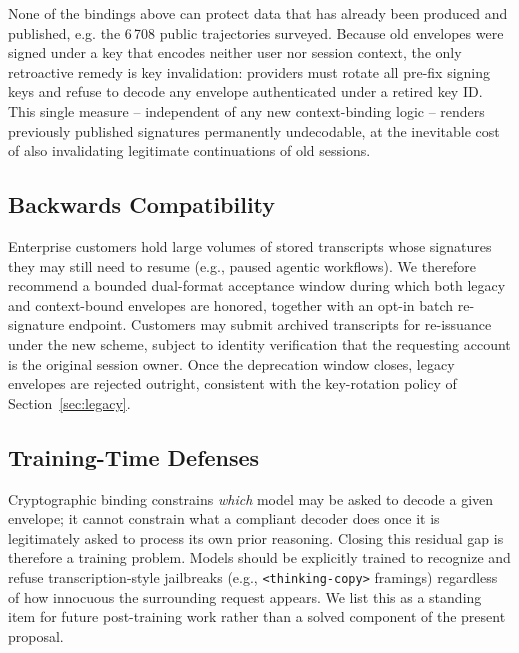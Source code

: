 None of the bindings above can protect data that has already been
produced and published, e.g. the 6\,708 public trajectories
surveyed.  Because old envelopes
were signed under a key that encodes neither user nor session context,
the only retroactive remedy is key invalidation: providers must rotate
all pre-fix signing keys and refuse to decode any envelope authenticated
under a retired key ID.  This single measure -- independent of any new
context-binding logic -- renders previously published signatures
permanently undecodable, at the inevitable cost of also invalidating
legitimate continuations of old sessions.

\subsection{Backwards Compatibility}
\label{sec:backcompat}

Enterprise customers hold large volumes of stored transcripts whose
signatures they may still need to resume (e.g., paused agentic workflows).
We therefore recommend a bounded dual-format acceptance window during
which both legacy and context-bound envelopes are honored, together with
an opt-in batch re-signature endpoint.  Customers may submit archived
transcripts for re-issuance under the new scheme, subject to identity
verification that the requesting account is the original session owner.
Once the deprecation window closes, legacy envelopes are rejected
outright, consistent with the key-rotation policy of
Section~\ref{sec:legacy}.

\subsection{Training-Time Defenses}
\label{sec:training}

Cryptographic binding constrains \emph{which} model may be asked to
decode a given envelope; it cannot constrain what a compliant decoder
does once it is legitimately asked to process its own prior reasoning. 
Closing this residual gap is therefore a training problem. Models should be explicitly trained to recognize and
refuse transcription-style jailbreaks (e.g., \texttt{<thinking-copy>}
framings) regardless of how innocuous the surrounding request appears.
We list this as a standing item for future post-training work rather than
a solved component of the present proposal.
